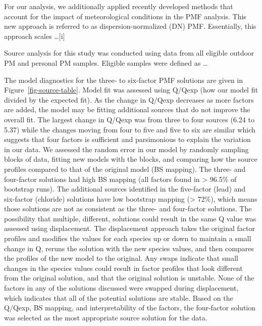 \documentclass[
  letterpaper,
  DIV=11,
  numbers=noendperiod]{scrartcl}
\begin{document}
For our analysis, we additionally applied recently developed methods
that account for the impact of meteorological conditions in the PMF
analysis. This new approach is referred to as dispersion-normalized (DN)
PMF. Essentially, this approach scales \ldots{[}i{]}

Source analysis for this study was conducted using data from all
eligible outdoor PM and personal PM samples. Eligible samples were
defined as \ldots{}

The model diagnostics for the three- to six-factor PMF solutions are
given in Figure~\ref{fig-source-table}. Model fit was assessed using
Q/Qexp (how our model fit divided by the expected fit). As the change in
Q/Qexp decreases as more factors are added, the model may be fitting
additional sources that do not improve the overall fit. The largest
change in Q/Qexp was from three to four sources (6.24 to 5.37) while the
changes moving from four to five and five to six are similar which
suggests that four factors is sufficient and parsimonious to explain the
variation in our data. We assessed the random error in our model by
randomly sampling blocks of data, fitting new models with the blocks,
and comparing how the source profiles compared to that of the original
model (BS mapping). The three- and four-factor solutions had high BS
mapping (all factors found in \textgreater{} 96.5\% of bootstrap runs).
The additional sources identified in the five-factor (lead) and
six-factor (chloride) solutions have low bootstrap mapping
(\textgreater{} 72\%), which means those solutions are not as consistent
as the three- and four-factor solutions. The possibility that multiple,
different, solutions could result in the same Q value was assessed using
displacement. The displacement approach takes the original factor
profiles and modifies the values for each species up or down to maintain
a small change in Q, reruns the solution with the new species values,
and then compares the profiles of the new model to the original. Any
swaps indicate that small changes in the species values could result in
factor profiles that look different from the original solution, and that
the original solution is unstable. None of the factors in any of the
solutions discussed were swapped during displacement, which indicates
that all of the potential solutions are stable. Based on the Q/Qexp, BS
mapping, and interpretability of the factors, the four-factor solution
was selected as the most appropriate source solution for the data.
\end{document}
